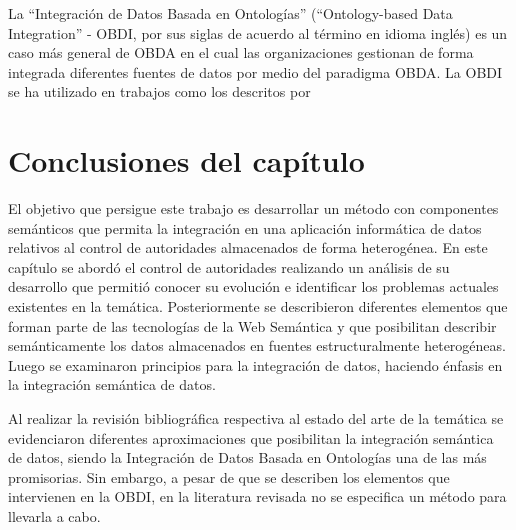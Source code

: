La ``Integración de Datos Basada en Ontologías'' (``Ontology-based Data Integration'' - OBDI, por sus siglas de acuerdo al término en idioma inglés) es un caso más general de OBDA en el cual las organizaciones gestionan de forma integrada diferentes fuentes de datos por medio del paradigma OBDA. La OBDI se ha utilizado en trabajos como los descritos por \cite{Calvanese2016,Daraio2016,Kharlamov:2016:OIS:2882903.2899385}

\section{Conclusiones del capítulo}
El objetivo que persigue este trabajo es desarrollar un método con componentes semánticos que permita la integración en una aplicación informática de datos relativos al control de autoridades almacenados de forma heterogénea. En este capítulo se abordó el control de autoridades realizando un análisis de su desarrollo que permitió conocer su evolución e identificar los problemas actuales existentes en la temática. Posteriormente se describieron diferentes elementos que forman parte de las tecnologías de la Web Semántica y que posibilitan describir semánticamente los datos almacenados en fuentes estructuralmente heterogéneas. Luego se examinaron principios para la integración de datos, haciendo énfasis en la integración semántica de datos.

Al realizar la revisión bibliográfica respectiva al estado del arte de la temática se evidenciaron diferentes aproximaciones que posibilitan la integración semántica de datos, siendo la Integración de Datos Basada en Ontologías una de las más promisorias. Sin embargo, a pesar de que se describen los elementos que intervienen en la OBDI, en la literatura revisada no se especifica un método para llevarla a cabo.









